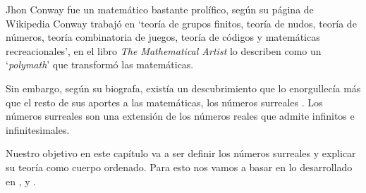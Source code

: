 Jhon Conway fue un matem\'atico bastante prol\'ifico, seg\'un su p\'agina de Wikipedia \cite{wiki:John_Horton_Conway} Conway trabaj\'o en `teor\'ia de grupos finitos, teor\'ia de nudos, teor\'ia de n\'umeros, teor\'ia combinatoria de juegos, teor\'ia de c\'odigos y matem\'aticas recreacionales', en el libro \textit{The Mathematical Artist} \cite{MathematicalArtist2022} lo describen como un `\textit{polymath}' que transform\'o las matem\'aticas.

Sin embargo, seg\'un su biografa, exist\'ia un descubrimiento que lo enorgullec\'ia m\'as que el resto de sus aportes a las matem\'aticas, los n\'umeros surreales \cite{YTNumberphileConway}. Los n\'umeros surreales son una extensi\'on de los n\'umeros reales que admite infinitos e infinitesimales.

Nuestro objetivo en este cap\'itulo va a ser definir los n\'umeros surreales y explicar su teor\'ia como cuerpo ordenado. Para esto nos vamos a basar en lo desarrollado en \cite{Conway2000}, \cite{Tondering2019} y \cite{Gonshor1986}.

